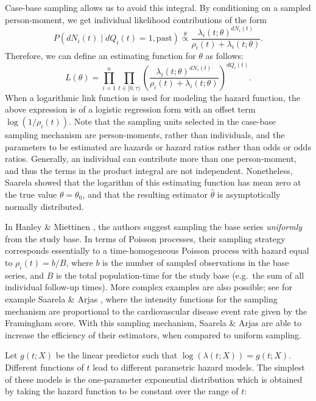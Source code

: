 \documentclass[
]{jss}
\begin{document}
Case-base sampling allows us to avoid this integral. By conditioning on
a sampled person-moment, we get individual likelihood contributions of
the form
\[P(dN_{i}(t) \mid dQ_{i}(t) = 1,\mathrm{past}) \stackrel{\theta}{\propto} \frac{\lambda_{i}(t; \theta)^{dN_{i}(t)}}{\rho_i(t) + \lambda_{i}(t;\theta)}.\]
Therefore, we can define an estimating function for \(\theta\) as
follows: \begin{equation}
L(\theta) = \prod_{i=1}^{n} \prod_{t\in[0,\tau)} \left(\frac{\lambda_{i}(t; \theta)^{dN_{i}(t)}}{\rho_i(t) + \lambda_{i}(t;\theta)}\right)^{dQ_i(t)}. \label{eq:lik-function}
\end{equation} When a logarithmic link function is used for modeling the
hazard function, the above expression is of a logistic regression form
with an offset term \(\log(1/\rho_i(t))\). Note that the sampling units
selected in the case-base sampling mechanism are person-moments, rather
than individuals, and the parameters to be estimated are hazards or
hazard ratios rather than odds or odds ratios. Generally, an individual
can contribute more than one person-moment, and thus the terms in the
product integral are not independent. Nonetheless, Saarela
\citeyearpar{saarela2016case} showed that the logarithm of this
estimating function has mean zero at the true value \(\theta=\theta_0\),
and that the resulting estimator \(\hat{\theta}\) is asymptotically
normally distributed.

In Hanley \& Miettinen \citeyearpar{hanley2009fitting}, the authors
suggest sampling the base series \emph{uniformly} from the study base.
In terms of Poisson processes, their sampling strategy corresponds
essentially to a time-homogeneous Poisson process with hazard equal to
\(\rho_i(t) = b/B\), where \(b\) is the number of sampled observations
in the base series, and \(B\) is the total population-time for the study
base (e.g.~the sum of all individual follow-up times). More complex
examples are also possible; see for example Saarela \& Arjas
\citeyearpar{saarela2015non}, where the intensity functions for the
sampling mechanism are proportional to the cardiovascular disease event
rate given by the Framingham score. With this sampling mechanism,
Saarela \& Arjas are able to increase the efficiency of their
estimators, when compared to uniform sampling.

Let \(g(t; X)\) be the linear predictor such that
\(\log(\lambda(t;X)) = g(t; X)\). Different functions of \(t\) lead to
different parametric hazard models. The simplest of these models is the
one-parameter exponential distribution which is obtained by taking the
hazard function to be constant over the range of \(t\):
\end{document}
